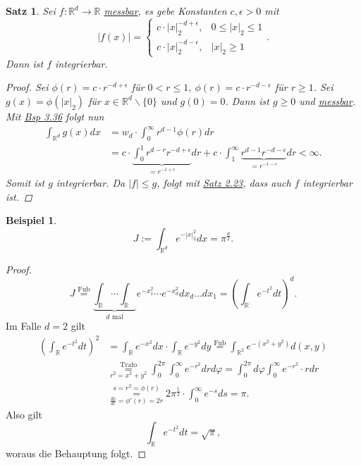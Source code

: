 \documentclass[a4paper]{scrreprt}
\newcommand{\R}{\mathbb{R}}
\newcommand{\overunderset}[3]{\overset{#1}{\underset{#3}{#2}}}
\newcommand{\jlabel}[1]{\label{j_#1}}
\newcommand{\jshortlink}[1]{\jhyperref{#1}{\text{#1}}}
\newcommand{\jhyperref}[2]{\hyperref[j_#1]{#2}}
\newcommand{\jlink}[1]{\jhyperref{#1}{#1}}
\newcommand{\jabb}[3]{ #1: #2 \rightarrow #3 }
\newcommand{\jshortlinkFubini}{\jhyperref{Fubini}{\text{Fub}}}
\theoremstyle{plain}
\newtheorem{satz}[thm]{Satz}
\theoremstyle{definition}
\newtheorem{expl}[thm]{Beispiel}
\begin{document}
{{{{\begin{satz}
    \jlabel{Satz 3.37}
    Sei $\jabb{f}{\R^d}{\R}$ \jlink{messbar}, es gebe Konstanten $c,\epsilon>0$ mit
    \[
        |f(x)| = \begin{cases}
                     c\cdot|x|_2^{-d+\epsilon}, & 0 \le |x|_2 \le 1\\
                     c\cdot|x|_2^{-d-\epsilon}, & |x|_2 \ge 1
                 \end{cases}.
    \]
    Dann ist $f$ integrierbar.
    \begin{proof}
        Sei $\phi(r) = c\cdot r^{-d+\epsilon}$ für $0<r \le 1,\ \phi(r)=c\cdot r^{-d-\epsilon}$ für $r\ge 1$. Sei $g(x) = \phi(|x|_2)$ für $x\in \R^d\backslash \{0\}$ und $g(0) = 0$. Dann ist $g\ge 0$ und \jlink{messbar}. Mit \jlink{Bsp 3.36} folgt nun
        \[
            \begin{split}
                \int_{\R^d} g(x) dx &= w_d \cdot \int_0^\infty r^{d-1}\phi(r)dr\\
                                    &= c\cdot \underbrace{\int_0^1 r^{d-r} r^{-d+\epsilon}}_{=r^{-1+\epsilon}}dr + c\cdot \int_1^\infty \underbrace{r^{d-1} r^{-d-\epsilon}}_{=r^{-1-\epsilon}}dr < \infty.
            \end{split}
        \]
        Somit ist $g$ integrierbar. Da $|f| \le g$, folgt mit \jlink{Satz 2.23}, dass auch $f$ integrierbar ist.
    \end{proof}
\end{satz}

\begin{expl}
    \jlabel{Bsp 3.38}
    \[
        J := \int_{\R^d} e^{-|x|_2^2}dx = \pi^\frac{d}{2}.
    \]
    \begin{proof}
        \[
            J \overset{\jshortlinkFubini}{=} \underbrace{\int_\R \cdots \int_\R}_{d\text{ mal}} e^{-x_1^2} \cdots e^{-x_d^2} dx_d \dots dx_1 = \left( \int_\R e^{-t^2} dt \right)^d.
        \]
        Im Falle $d=2$ gilt
        \[
            \begin{split}
                \left(\int_\R e^{-t^2} dt \right)^2 &= \int_\R e^{-x^2} dx \cdot \int_\R e^{-y^2} dy \overset{\jshortlinkFubini}{=} \int_{\R^2} e^{-(x^2+y^2)} d(x,y)\\
                &\overunderset{\jshortlink{Trafo}}{=}{r^2=x^2+y^2} \int_0^{2\pi}\int_0^\infty e^{-r^2} dr d\varphi = \int_0^{2\pi}d\varphi \int_0^\infty e^{-r^2} \cdot r dr\\
                &\overunderset{s=r^2=\phi(r)}{=}{\frac{ds}{dr}=\phi'(r)=2r} 2\pi^{\frac{1}{2}} \cdot \int_0^\infty e^{-s} ds = \pi.                
            \end{split}
        \]
        Also gilt
        \[
            \int_\R e^{-t^2} dt = \sqrt{\pi},
        \]
        woraus die Behauptung folgt.
    \end{proof}
\end{expl}

}}}}
\end{document}
